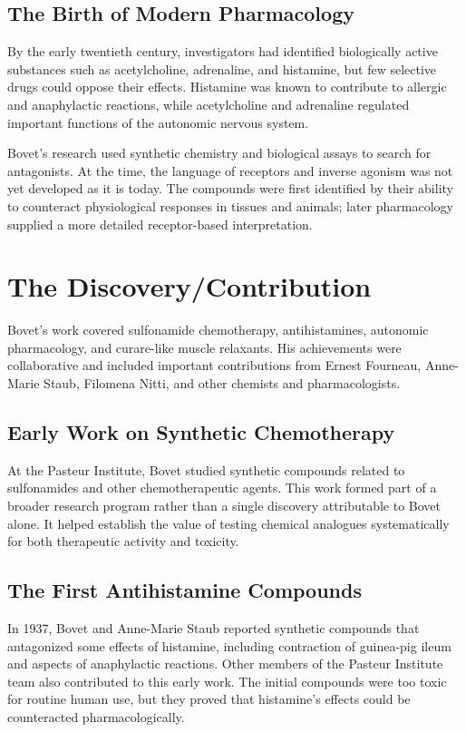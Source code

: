 \subsection{The Birth of Modern Pharmacology}

By the early twentieth century, investigators had identified biologically active substances such as acetylcholine, adrenaline, and histamine, but few selective drugs could oppose their effects. Histamine was known to contribute to allergic and anaphylactic reactions, while acetylcholine and adrenaline regulated important functions of the autonomic nervous system.

Bovet's research used synthetic chemistry and biological assays to search for antagonists. At the time, the language of receptors and inverse agonism was not yet developed as it is today. The compounds were first identified by their ability to counteract physiological responses in tissues and animals; later pharmacology supplied a more detailed receptor-based interpretation.

\section{The Discovery/Contribution}

Bovet's work covered sulfonamide chemotherapy, antihistamines, autonomic pharmacology, and curare-like muscle relaxants. His achievements were collaborative and included important contributions from Ernest Fourneau, Anne-Marie Staub, Filomena Nitti, and other chemists and pharmacologists.

\subsection{Early Work on Synthetic Chemotherapy}

At the Pasteur Institute, Bovet studied synthetic compounds related to sulfonamides and other chemotherapeutic agents. This work formed part of a broader research program rather than a single discovery attributable to Bovet alone. It helped establish the value of testing chemical analogues systematically for both therapeutic activity and toxicity.

\subsection{The First Antihistamine Compounds}

In 1937, Bovet and Anne-Marie Staub reported synthetic compounds that antagonized some effects of histamine, including contraction of guinea-pig ileum and aspects of anaphylactic reactions. Other members of the Pasteur Institute team also contributed to this early work. The initial compounds were too toxic for routine human use, but they proved that histamine's effects could be counteracted pharmacologically.

